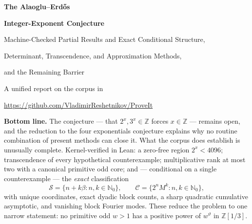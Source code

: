 \documentclass[11pt,oneside]{article}
\theoremstyle{definition}
\theoremstyle{remark}
\newcommand{\Nzero}{\mathbb N_0}
\newcommand{\Z}{\mathbb Z}
\newcommand{\thetaq}{\vartheta}
\newcommand{\Sol}{\mathcal S}
\newcommand{\Cand}{\mathcal C}
\newcommand{\Zthree}{\Z[1/3]}
\begin{document}

\begin{titlepage}
\centering
\vspace*{0.75cm}
{\Huge\bfseries The Alaoglu--Erd\H{o}s\par}
\vspace{0.2cm}
{\Huge\bfseries Integer-Exponent Conjecture\par}
\vspace{0.65cm}
{\LARGE Machine-Checked Partial Results and Exact Conditional Structure,\par}
\vspace{0.10cm}
{\LARGE Determinant, Transcendence, and Approximation Methods,\par}
\vspace{0.10cm}
{\LARGE and the Remaining Barrier\par}
\vspace{1.0cm}
{\large A unified report on the corpus in\par}
\vspace{0.12cm}
{\large \url{https://github.com/VladimirReshetnikov/ProveIt}\par}
\vfill
\begin{minipage}{0.9\textwidth}
\small
\textbf{Bottom line.}
The conjecture --- that $2^x,3^x\in\Z$ forces $x\in\Z$ --- remains open, and the reduction to
the four exponentials conjecture explains why no routine combination of present methods can
close it.  What the corpus does establish is unusually complete.  Kernel-verified in Lean: a
zero-free region $2^x<4096$; transcendence of every hypothetical counterexample; multiplicative
rank at most two with a canonical primitive odd core; and --- conditional on a single
counterexample --- the \emph{exact} classification
\[
  \Sol=\{n+k\beta:n,k\in\Nzero\},
  \qquad
  \Cand=\{2^nM^k:n,k\in\Nzero\},
\]
with unique coordinates, exact dyadic block counts, a sharp quadratic cumulative asymptotic,
and vanishing block Fourier modes.  These reduce the problem to one narrow statement: no
primitive odd $w>1$ has a positive power of $w^{\thetaq}$ in $\Zthree$.


\end{minipage}
\end{titlepage}
\end{document}
